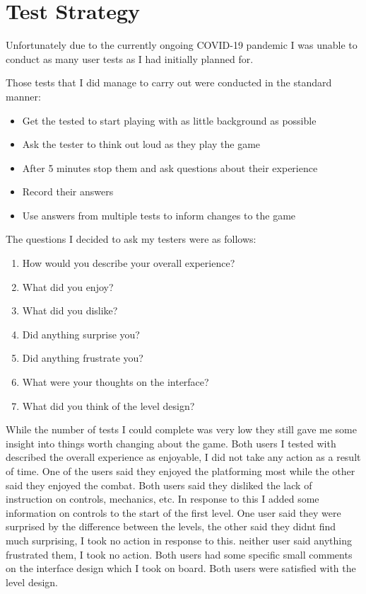 \documentclass{article}
\begin{document}
\section{Test Strategy}

Unfortunately due to the currently ongoing COVID-19 pandemic I was unable to conduct as many user tests as I had initially planned for.

Those tests that I did manage to carry out were conducted in the standard manner:

\begin{itemize}
    \itemsep0em 
    \item Get the tested to start playing with as little background as possible
    \item Ask the tester to think out loud as they play the game
    \item After 5 minutes stop them and ask questions about their experience
    \item Record their answers
    \item Use answers from multiple tests to inform changes to the game
\end{itemize}

The questions I decided to ask my testers were as follows:
\begin{enumerate}
    \itemsep0em 
    \item How would you describe your overall experience?
    \item What did you enjoy?
    \item What did you dislike?
    \item Did anything surprise you?
    \item Did anything frustrate you?
    \item What were your thoughts on the interface?
    \item What did you think of the level design?
\end{enumerate}

While the number of tests I could complete was very low they still gave me some insight into things worth changing about the game.
Both users I tested with described the overall experience as enjoyable, I did not take any action as a result of time.
One of the users said they enjoyed the platforming most while the other said they enjoyed the combat.
Both users said they disliked the lack of instruction on controls, mechanics, etc.
In response to this I added some information on controls to the start of the first level.
One user said they were surprised by the difference between the levels, the other said they didnt find much surprising, I took no action in response to this.
neither user said anything frustrated them, I took no action.
Both users had some specific small comments on the interface design which I took on board.
Both users were satisfied with the level design.
\end{document}
